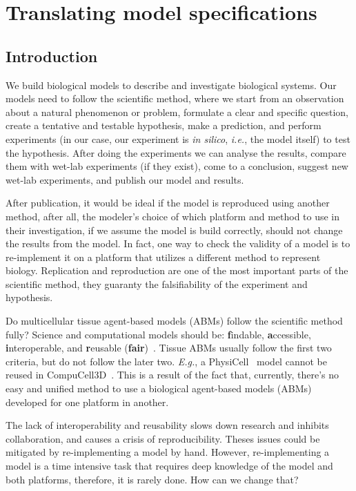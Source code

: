 \chapter{Translating model specifications}\label{cha:translator}

\section{Introduction}\label{sec:trans:intro}


We build biological models to describe and investigate biological systems. Our models need to follow the scientific method, where we start from an observation about a natural phenomenon or problem, formulate a clear and specific question, create a tentative and testable hypothesis, make a prediction, and perform experiments (in our case, our experiment is \textit{in silico}, \textit{i.e.}, the model itself) to test the hypothesis. After doing the experiments we can analyse the results, compare them with wet-lab experiments (if they exist), come to a conclusion, suggest new wet-lab experiments, and publish our model and results. 

After publication, it would be ideal if the model is reproduced using another method, after all, the modeler's choice of which platform and method to use in their investigation, if we assume the model is build correctly, should not change the results from the model. In fact, one way to check the validity of a model is to re-implement it on a platform that utilizes a different method to represent biology. Replication and reproduction are one of the most important parts of the scientific method, they guaranty the falsifiability of the experiment and hypothesis.

Do multicellular tissue agent-based models (ABMs) follow the scientific method fully? Science and computational models should be: \textbf{f}indable, \textbf{a}ccessible, \textbf{i}nteroperable, and \textbf{r}eusable (\textbf{fair})~\cite{wilkinson_fair_2016}. Tissue ABMs usually follow the first two criteria, but do not follow the later two. \textit{E.g.}, a PhysiCell~\cite{ghaffarizadeh_physicell_2018} model cannot be reused in CompuCell3D~\cite{swat_multi-scale_2012}. This is a result of the fact that, currently, there's no easy and unified method to use a biological agent-based models (ABMs) developed for one platform in another. 

The lack of interoperability and reusability slows down research and inhibits collaboration, and causes a crisis of reproducibility. Theses issues could be mitigated by re-implementing a model by hand. However, re-implementing a model is a time intensive task that requires deep knowledge of the model and both platforms, therefore, it is rarely done. How can we change that?

